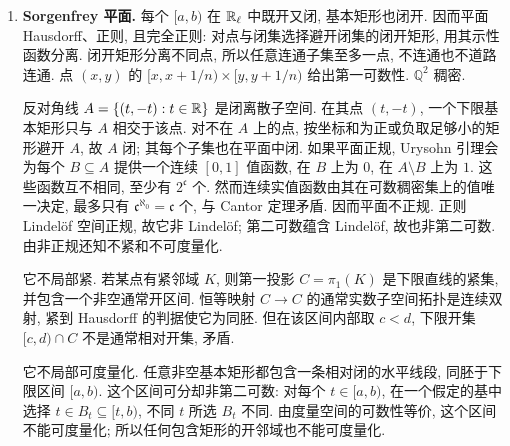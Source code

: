 \begin{solution}
\begin{enumerate}
稠密完备序的区间连通: 若 $x<y$ 分别属于不交开集构成的分离两侧, 考察左侧在 $[x,y]$ 内的上确界 $c$. 若 $c$ 在左侧, 其开邻域和序稠密性给出更大的左侧点; 若在右侧, 其左邻域排除逼近 $c$ 的左侧点. 端点情形因 $x,y$ 分居两侧也排除. 所以有序方形连通.

集合 $\{x\}\times(0,1)$ ($x\in[0,1]$) 是不可数族两两不交非空开集, 可数稠密集不可能逐一与之相交. 故不可分、非第二可数且不可度量化, 最后一项也可由紧度量空间第二可数推出. 每点仍有可数邻域基: 纤维内部只用第二坐标的可数区间; 在 $(x,0)$ 或 $(x,1)$ 处, 从相邻纤维取第一坐标逐步逼近 $x$ 的序列, 再配合同一纤维内的第二坐标序列即可. 两个全局端点只取存在的那一侧.

若一道路的端点第一坐标不同, 其连通像必须包含两端点之间的整个序区间, 因而遇到不可数多个竖直开区间. 但道路像可分, 因为 $[0,1]$ 中有理点的像稠密, 与这些不交开集矛盾. 因此不道路连通. 在 $(1/2,0)$ 的任意开邻域内, 都能找到一个包含不可数多个完整纤维的闭序区间. 此区间紧而不可分; 若该邻域可度量化, 此区间将是紧度量空间并可分, 矛盾. 故空间也不局部可度量化.

\item \textbf{Sorgenfrey 平面.}
每个 $[a,b)$ 在 $\mathbb R_\ell$ 中既开又闭, 基本矩形也闭开. 因而平面 Hausdorff、正则, 且完全正则: 对点与闭集选择避开闭集的闭开矩形, 用其示性函数分离. 闭开矩形分离不同点, 所以任意连通子集至多一点, 不连通也不道路连通. 点 $(x,y)$ 的 $[x,x+1/n)\times[y,y+1/n)$ 给出第一可数性. $\mathbb Q^2$ 稠密.

反对角线 $A=\{(t,-t):t\in\mathbb R\}$ 是闭离散子空间. 在其点 $(t,-t)$, 一个下限基本矩形只与 $A$ 相交于该点. 对不在 $A$ 上的点, 按坐标和为正或负取足够小的矩形避开 $A$, 故 $A$ 闭; 其每个子集也在平面中闭. 如果平面正规, Urysohn 引理会为每个 $B\subseteq A$ 提供一个连续 $[0,1]$ 值函数, 在 $B$ 上为 $0$, 在 $A\setminus B$ 上为 $1$. 这些函数互不相同, 至少有 $2^{\mathfrak c}$ 个. 然而连续实值函数由其在可数稠密集上的值唯一决定, 最多只有 $\mathfrak c^{\aleph_0}=\mathfrak c$ 个, 与 Cantor 定理矛盾. 因而平面不正规. 正则 Lindel\"of 空间正规, 故它非 Lindel\"of; 第二可数蕴含 Lindel\"of, 故也非第二可数. 由非正规还知不紧和不可度量化.

它不局部紧. 若某点有紧邻域 $K$, 则第一投影 $C=\pi_1(K)$ 是下限直线的紧集, 并包含一个非空通常开区间. 恒等映射 $C\to C$ 的通常实数子空间拓扑是连续双射, 紧到 Hausdorff 的判据使它为同胚. 但在该区间内部取 $c<d$, 下限开集 $[c,d)\cap C$ 不是通常相对开集, 矛盾.

它不局部可度量化. 任意非空基本矩形都包含一条相对闭的水平线段, 同胚于下限区间 $[a,b)$. 这个区间可分却非第二可数: 对每个 $t\in[a,b)$, 在一个假定的基中选择 $t\in B_t\subseteq[t,b)$, 不同 $t$ 所选 $B_t$ 不同. 由度量空间的可数性等价, 这个区间不能可度量化; 所以任何包含矩形的开邻域也不能可度量化.


\end{enumerate}
\end{solution}
